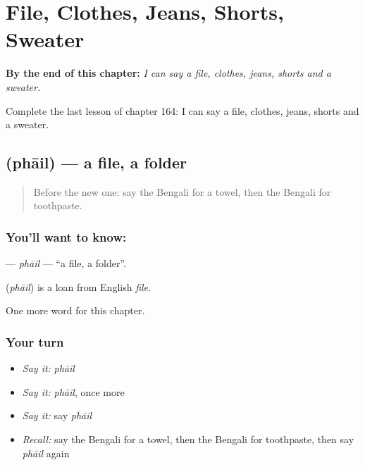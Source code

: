 
\chapter{File, Clothes, Jeans, Shorts, Sweater}
\label{ch:bn-file-clothes-jeans-shorts-sweater}

\begin{chapteropening}
\textbf{By the end of this chapter:} \emph{I can say a file, clothes, jeans, shorts and a sweater.}

Complete the last lesson of chapter 164: I can say a file, clothes, jeans, shorts and a sweater.
\end{chapteropening}

\section[\texorpdfstring{\bn{ফাইল} (phāil)}{ফাইল (phāil)}]{ (phāil) — a file, a folder}

\label{lesson:BN-C164-phail}



\begin{quote}
Before the new one: say the Bengali for a towel, then the Bengali for toothpaste.
\end{quote}

\subsection*{You'll want to know: }
\textbf{} — \emph{phāil} — \textquotedblleft{}a file, a folder\textquotedblright{}.

\begin{cousinweb}
\textbf{} (\emph{phāil}) is a loan from English \emph{file}.
\end{cousinweb}

\begin{grammarlens}[title={What you've built}]
One more word for this chapter.
\end{grammarlens}

\subsection*{Your turn}
\begin{itemize}
\raggedright
  \item \emph{Say it:} \emph{phāil}
  \item \emph{Say it:} \emph{phāil}, once more
  \item \emph{Say it:} say \emph{phāil}
  \item \emph{Recall:} say the Bengali for a towel, then the Bengali for toothpaste, then say \emph{phāil} again
\end{itemize}

